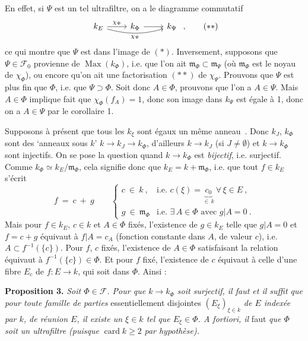 \documentclass[11pt]{article}
\newcommand{\printedpage}[1]{\marginpar{\footnotesize p.~#1}}
\newcommand{\msp}[1]{\marginpar{\footnotesize [#1]}}
\begin{document}
En effet, si $\Psi$ est un tel ultrafiltre, on
\msp{page 8}
a le diagramme commutatif
\[
\begin{tikzcd}
k_E \arrow[r, "\chi_\Phi"] \arrow[rr, bend right=15, "\chi_\Psi"'] & k_\Phi \arrow[r] & k_\Psi
\end{tikzcd}\ , \tag*{$(**)$}
\]
ce qui montre que $\Psi$ est dans l'image de $(*)$. Inversement, supposons que $\Psi\in\mathcal{F}_0$ provienne de $\operatorname{Max}(k_\Phi)$, i.e. que l'on ait $\mathfrak{m}_\Phi\subset\mathfrak{m}_\Psi$ (où $\mathfrak{m}_\Phi$ est le noyau de $\chi_\Phi$), ou encore qu'on ait une factorisation $(**)$ de $\chi_\Psi$. Prouvons que $\Psi$ est plus fin que $\Phi$, i.e. que $\Psi\supset\Phi$. Soit donc $A\in\Phi$, prouvons que l'on a $A\in\Psi$. Mais $A\in\Phi$ implique fait que $\chi_\Phi(f_A)=1$, donc son image dans $k_\Psi$ est égale à 1, donc on a $A\in\Psi$ par le corollaire 1.

\printedpage{195}

\msp{page 9}
Supposons à présent que tous les $k_\xi$ sont égaux un même anneau \,. Donc $k_J$, $k_\Phi$ sont des `anneaux sous $k$' $k\longrightarrow k_J\longrightarrow k_\Phi$, d'ailleurs $k\longrightarrow k_J$ (si $J\neq\emptyset$) et $k\longrightarrow k_\Phi$ sont injectifs. On se pose la question quand $k\longrightarrow k_\Phi$ est \textit{bijectif}, i.e. surjectif. Comme $k_\Phi\simeq k_E/\mathfrak{m}_\Phi$, cela signifie donc que $k_E=k+\mathfrak{m}_\Phi$, i.e. que tout $f\in k_E$ s'écrit
\[
f\ =\ c\ +\ g\qquad
\begin{cases}
c\ \in\ k\ , & \text{i.e. } c(\xi)=\underbrace{c_0}_{\in\,k}\ \forall\,\xi\in E\ ,\\[2ex]
g\ \in\ \mathfrak{m}_\Phi & \text{i.e. } \exists\,A\in\Phi \text{ avec } g|A=0\ .
\end{cases}
\]
Mais pour $f\in k_E$, $c\in k$ et $A\in\Phi$ fixés, l'existence de $g\in k_E$ telle que $g|A=0$ et $f=c+g$ équivaut à $f|A=c_A$ (fonction constante dans $A$, de valeur $c$), i.e. $A\subset f^{-1}(\{c\})$. Pour $f$, $c$ fixés, l'existence de $A\in\Phi$ satisfaisant la relation équivaut à $f^{-1}(\{c\})\in\Phi$. Et pour $f$ fixé, l'existence de $c$ équivaut à celle d'une fibre $E_c$ de $f:E\longrightarrow k$, qui soit dans $\Phi$. Ainsi :

\textbf{Proposition 3.} \textit{Soit $\Phi\in\mathcal{F}$. Pour que $k\longrightarrow k_\Phi$ soit surjectif, il faut et il suffit que pour toute famille de parties} essentiellement disjointes \textit{$(E_\xi)_{\xi\in k}$ de $E$ indexée par $k$, de réunion $E$, il existe un $\xi\in k$ tel que $E_\xi\in\Phi$. A fortiori, il} faut \textit{que $\Phi$ soit un ultrafiltre (puisque} $\operatorname{card}k\geqslant 2$ \textit{par hypothèse).}
\end{document}
